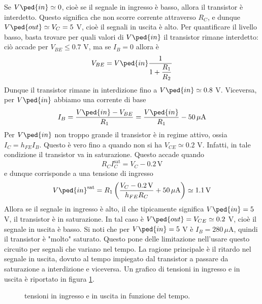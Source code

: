 \documentclass[a4paper, 11pt]{article}
\begin{document}
	\noindent Se $V\ped{in}\simeq0$, cioè se il segnale in ingresso è basso, allora il transistor è interdetto. Questo significa che non scorre corrente attraverso $R_C$, e dunque $V\ped{out}\simeq V_C=5$ V, cioè il segnali in uscita è alto. Per quantificare il livello basso, basta trovare per quali valori di $V\ped{in}$ il transistor rimane interdetto: ciò accade per $V_{BE}\leq0.7$ V, ma se $I_B=0$ allora è
	\[V_{BE}=V\ped{in}\frac{1}{1+\dfrac{R_1}{R_2}}\]
	Dunque il transistor rimane in interdizione fino a $V\ped{in}\simeq 0.8$ V. Viceversa, per $V\ped{in}$ abbiamo una corrente di base
	\[I_B=\frac{V\ped{in}-V_{BE}}{R_1}=\frac{V\ped{in}}{R_1}-50\,\mu\mathrm{A}\]
	Per $V\ped{in}$ non troppo grande il transistor è in regime attivo, ossia $I_C=h_{FE}I_B$. Questo è vero fino a quando non si ha $V_{CE}\simeq0.2$ V. Infatti, in tale condizione il transistor va in saturazione. Questo accade quando
	\[R_CI_C^{\text {sat}}=V_C-0.2\,\mathrm{V}\]
	e dunque corrisponde a una tensione di ingresso
	\[V\ped{in}^{\text{sat}}=R_1\left(\frac{V_C-0.2\,\mathrm{V}}{h_{FE}R_C}+50\,\mu\mathrm{A}\right)\simeq1.1\,\mathrm{V}\]
	Allora se il segnale in ingresso è alto, il che tipicamente significa $V\ped{in}=5$ V, il transistor è in saturazione. In tal caso è $V\ped{out}=V_{CE}\simeq0.2$ V, cioè il segnale in uscita è basso. Si noti che per $V\ped{in}=5$ V è $I_B=280\,\mu$A, quindi il transistor è "molto" saturato. Questo pone delle limitazione nell'usare questo circuito per segnali che variano nel tempo. La ragione principale è il ritardo nel segnale in uscita, dovuto al tempo impiegato dal transistor a passare da saturazione a interdizione e viceversa. Un grafico di tensioni in ingresso e in uscita è riportato in figura \ref{fig:notbjtgraf}.
	\begin{figure}[h!]
		\centering
		\caption{tensioni in ingresso e in uscita in funzione del tempo.}
		\label{fig:notbjtgraf}
	\end{figure}
\end{document}
